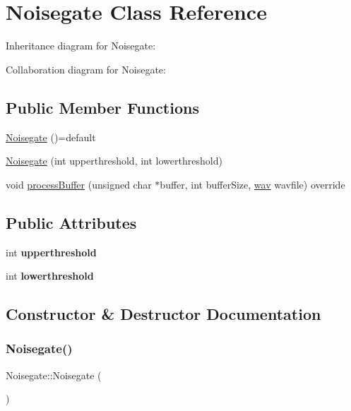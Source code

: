 \hypertarget{classNoisegate}{}\section{Noisegate Class Reference}
\label{classNoisegate}


Inheritance diagram for Noisegate\+:


Collaboration diagram for Noisegate\+:
\subsection*{Public Member Functions}
\begin{DoxyCompactItemize}
\item 
\hyperlink{classNoisegate_acc984041f06bb8b59e652dcafdde0908}{Noisegate} ()=default
\item 
\hyperlink{classNoisegate_a71c4785fc5ab3b3fafc258efd12465b3}{Noisegate} (int upperthreshold, int lowerthreshold)
\item 
void \hyperlink{classNoisegate_ad379f3e2ec1b28788dbf65f4f9a4427c}{process\+Buffer} (unsigned char $\ast$buffer, int buffer\+Size, \hyperlink{classwav}{wav} wavfile) override
\end{DoxyCompactItemize}
\subsection*{Public Attributes}
\begin{DoxyCompactItemize}
\item 
\mbox{\label{classNoisegate_ab9db2126669c481fbcf99420ca6b8f06}} 
int {\bfseries upperthreshold}
\item 
\mbox{\label{classNoisegate_a8324f40e9660dfb2244fd2925db26e14}} 
int {\bfseries lowerthreshold}
\end{DoxyCompactItemize}


\subsection{Constructor \& Destructor Documentation}
\mbox{\label{classNoisegate_acc984041f06bb8b59e652dcafdde0908}} 
\subsubsection{\texorpdfstring{Noisegate()}{Noisegate()}\hspace{0.1cm}{\footnotesize\ttfamily [1/2]}}
{\footnotesize\ttfamily Noisegate\+::\+Noisegate (\begin{DoxyParamCaption}{ }\end{DoxyParamCaption})\hspace{0.3cm}{\ttfamily [default]}}

